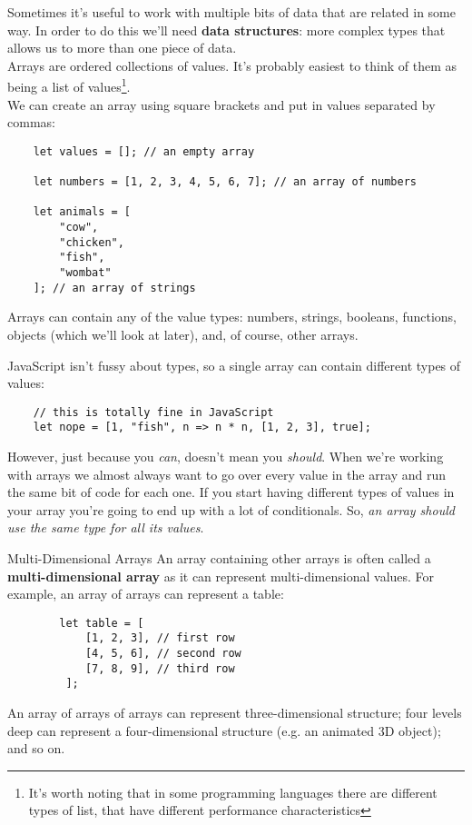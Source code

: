 Sometimes it's useful to work with multiple bits of data that are related in some way. In order to do this we'll need \textbf{data structures}: more complex types that allows us to more than one piece of data.
\\

Arrays are ordered collections of values. It's probably easiest to think of them as being a list of values\footnote{It's worth noting that in some programming languages there are different types of list, that have different performance characteristics}.
\\

We can create an array using square brackets and put in values separated by commas:

\begin{verbatim}
    let values = []; // an empty array

    let numbers = [1, 2, 3, 4, 5, 6, 7]; // an array of numbers

    let animals = [
        "cow",
        "chicken",
        "fish",
        "wombat"
    ]; // an array of strings
\end{verbatim}

Arrays can contain any of the value types: numbers, strings, booleans, functions, objects (which we'll look at later), and, of course, other arrays.
\\

\pagebreak

JavaScript isn't fussy about types, so a single array can contain different types of values:

\begin{verbatim}
    // this is totally fine in JavaScript
    let nope = [1, "fish", n => n * n, [1, 2, 3], true];
\end{verbatim}

However, just because you \textit{can}, doesn't mean you \textit{should}. When we're working with arrays we almost always want to go over every value in the array and run the same bit of code for each one. If you start having different types of values in your array you're going to end up with a lot of conditionals. So, \textit{an array should use the same type for all its values}.
\\


\begin{infobox}{Multi-Dimensional Arrays}
    An array containing other arrays is often called a \textbf{multi-dimensional array} as it can represent multi-dimensional values. For example, an array of arrays can represent a table:

    \begin{verbatim}
        let table = [
            [1, 2, 3], // first row
            [4, 5, 6], // second row
            [7, 8, 9], // third row
         ];
    \end{verbatim}

    An array of arrays of arrays can represent three-dimensional structure; four levels deep can represent a four-dimensional structure (e.g. an animated 3D object); and so on.
\end{infobox}

